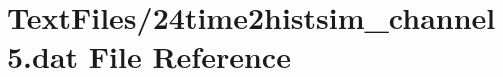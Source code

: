 \hypertarget{24time2histsim__channel5_8dat}{}\section{Text\+Files/24time2histsim\+\_\+channel5.dat File Reference}
\label{24time2histsim__channel5_8dat}
